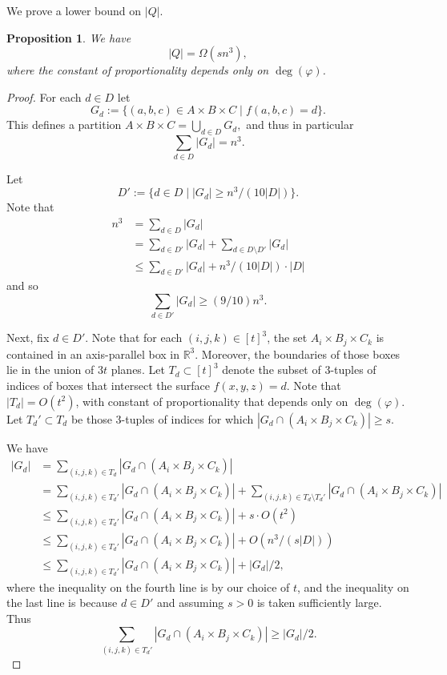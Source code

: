 \documentclass[letterpaper, reqno,11pt]{article}
\newcommand{\RR}{\mathbb{R}}
\newtheorem{prop}[thm]{Proposition}
\theoremstyle{definition}
\theoremstyle{remark}
\begin{document}
We prove a lower bound on $|Q|$. 
\begin{prop}\label{prop:lowerQ}
We have 
\begin{equation}\label{lowerQ}
|Q|=\Omega(sn^3),
\end{equation}
where the constant of proportionality depends only on $\deg(\varphi)$.
\end{prop}
\begin{proof}
For each $d\in D$ let 
$$
G_d:=\{(a,b,c)\in A\times B\times C\mid f(a,b,c)=d\}.
$$
This defines a partition 
$A\times B\times C=\bigcup_{d\in D}G_d,
$ 
and thus in particular
$$
\sum_{d\in D}\left|G_d\right|=n^3.
$$


Let 
$$
D':=\{d\in D\mid |G_d|\ge n^3/(10|D|)\}.
$$
Note that 
\begin{align*}
n^3
&=\sum_{d\in D}|G_d|\\
&=\sum_{d\in D'}|G_d|+\sum_{d\in D\setminus D'}|G_d|\\
&\le\sum_{d\in D'}|G_d|+n^3/(10|D|)\cdot |D|
\end{align*}
and so
\begin{equation}\label{sumDprime}
\sum_{d\in D'}|G_d|\ge (9/10)n^3.
\end{equation}

Next, fix $d\in D'$. 
Note that for each $(i,j,k)\in[t]^3$, the set $A_i\times B_j\times C_k$ is contained in an axis-parallel box in $\RR^3$. Moreover, the boundaries of those boxes lie in the union of $3t$ planes. 
Let $T_d\subset [t]^3$ denote the subset of 3-tuples of indices of boxes that intersect the surface $f(x,y,z)=d$. Note that $|T_d|=O(t^2)$, with constant of proportionality that depends only on $\deg(\varphi)$.
Let $T_d'\subset T_d$ be those 3-tuples of indices for which $|G_d\cap (A_i\times B_j\times C_k)|\ge s$.

We have
\begin{align*}
|G_d|
&=\sum_{(i,j,k)\in T_d}|G_d\cap (A_i\times B_j\times C_k)|\\
&=\sum_{(i,j,k)\in T_d'}|G_d\cap (A_i\times B_j\times C_k)|+\sum_{(i,j,k)\in T_d\setminus T_d'}|G_d\cap (A_i\times B_j\times C_k)|\\
&\le \sum_{(i,j,k)\in T_d'}|G_d\cap (A_i\times B_j\times C_k)|+s\cdot O(t^2)\\
&\le \sum_{(i,j,k)\in T_d'}|G_d\cap (A_i\times B_j\times C_k)|+O(n^3/(s|D|))\\
&\le \sum_{(i,j,k)\in T_d'}|G_d\cap (A_i\times B_j\times C_k)|+|G_d|/2,
\end{align*}
where the inequality on the fourth line is by our choice of $t$, 
and the inequality on the last line is because $d\in D'$ and assuming $s>0$ is taken sufficiently large.
Thus
\begin{equation}\label{eq:Gd}
\sum_{(i,j,k)\in T_d'}|G_d\cap (A_i\times B_j\times C_k)|\ge |G_d|/2.
\end{equation}


\end{proof}
\end{document}
